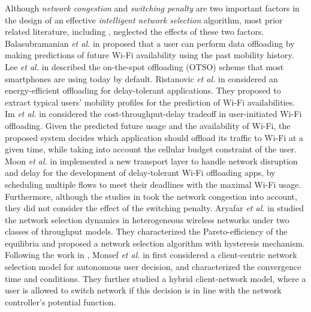 \documentclass[journal]{IEEEtran}
\begin{document}
  Although \emph{network congestion} and \emph{switching penalty} are two important factors in the design of an effective \emph{intelligent network selection} algorithm, most prior related literature, including \cite{balasubramanian_am10, lee_md10, ristanovic_ee11, im_ae13, moon_pd15}, neglected the effects of these two factors. 
  Balasubramanian \emph{et al.} in \cite{balasubramanian_am10} proposed that a user can perform data offloading by making predictions of future Wi-Fi availability using the past mobility history.
  Lee \emph{et al.} in \cite{lee_md10} described the on-the-spot offloading (OTSO) scheme that most smartphones are using today by default. %
  Ristanovic \emph{et al.} in \cite{ristanovic_ee11} considered an energy-efficient offloading for delay-tolerant applications. They proposed to extract typical users' mobility profiles for the prediction of Wi-Fi availabilities. %
  Im \emph{et al.} in \cite{im_ae13} considered the cost-throughput-delay tradeoff in user-initiated Wi-Fi offloading. Given the predicted future usage and the availability of Wi-Fi, the proposed system decides which application should offload its traffic to Wi-Fi at a given time, while taking into account the cellular budget constraint of the user.  
  Moon \emph{et al.} in \cite{moon_pd15} implemented a new transport layer to handle network disruption and delay for the development of delay-tolerant Wi-Fi offloading apps, by scheduling multiple flows to meet their deadlines with the maximal Wi-Fi usage.	
	Furthermore, although the studies in \cite{aryafar_rs13, monsef_cp15, mahindra_ap14, hu_an16} took the network congestion into account, they did not consider the effect of the switching penalty. 
  Aryafar \emph{et al.} in \cite{aryafar_rs13} studied the network selection dynamics in heterogeneous wireless networks under two classes of throughput models. They characterized the Pareto-efficiency of the equilibria and proposed a network selection algorithm with hysteresis mechanism.
  Following the work in \cite{aryafar_rs13}, Monsef \emph{et al.} in \cite{monsef_cp15} first considered a client-centric network selection model for autonomous user decision, and characterized the convergence time and conditions. They further studied a hybrid client-network model, where a user is allowed to switch network if this decision is in line with the network controller's potential function. %
\end{document}
